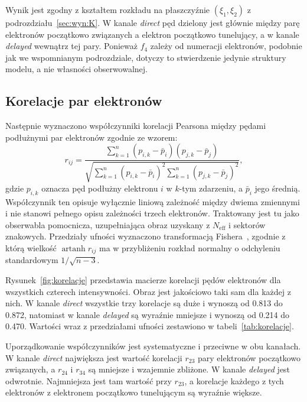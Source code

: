 \documentclass[12pt,a4paper]{article}
\newcommand{\Neff}{N_{\mathrm{eff}}}
\begin{document}
Wynik jest zgodny z kształtem rozkładu na płaszczyźnie $(\xi_1,\xi_2)$
z podrozdziału~\ref{sec:wyn:K}. W kanale \emph{direct} pęd dzielony
jest głównie między parę elektronów początkowo związanych a elektron
początkowo tunelujący, a w kanale \emph{delayed} wewnątrz tej pary.
Ponieważ $f_4$ zależy od numeracji elektronów, podobnie jak we wspomnianym podrozdziale, dotyczy to stwierdzenie jedynie struktury modelu, a nie własności obserwowalnej.

\subsection{Korelacje par elektronów}
\label{sec:wyn:korelacje}

Następnie wyznaczono współczynniki korelacji Pearsona między pędami
podłużnymi par elektronów zgodnie ze wzorem:
\begin{equation}
  r_{ij}=\frac{\displaystyle\sum_{k=1}^{n}\left(p_{i,k}-\bar{p}_i\right)\left(p_{j,k}-\bar{p}_j\right)}
              {\sqrt{\displaystyle\sum_{k=1}^{n}\left(p_{i,k}-\bar{p}_i\right)^{2}
                     \displaystyle\sum_{k=1}^{n}\left(p_{j,k}-\bar{p}_j\right)^{2}}},
  \label{eq:pearson}
\end{equation}
gdzie $p_{i,k}$ oznacza pęd podłużny elektronu $i$ w $k$-tym zdarzeniu,
a $\bar{p}_i$ jego średnią. Współczynnik ten opisuje wyłącznie liniową
zależność między dwiema zmiennymi i nie stanowi pełnego opisu
zależności trzech elektronów. Traktowany jest tu jako obserwabla
pomocnicza, uzupełniająca obraz uzyskany z $\Neff$ i sektorów
znakowych. Przedziały ufności wyznaczono transformacją
Fishera~\cite{Fisher1921}, zgodnie z którą wielkość
$\operatorname{artanh} r_{ij}$ ma w przybliżeniu rozkład normalny
o odchyleniu standardowym $1/\sqrt{n-3}$.

Rysunek~\ref{fig:korelacje} przedstawia macierze korelacji pędów elektronów dla
wszystkich czterech intensywności. Obraz jest jakościowo taki sam dla
każdej z nich. W kanale \emph{direct} wszystkie trzy
korelacje są duże i wynoszą od \num{0.813} do \num{0.872}, natomiast
w kanale \emph{delayed} są wyraźnie mniejsze i wynoszą od \num{0.214}
do \num{0.470}. Wartości wraz z przedziałami ufności zestawiono
w tabeli~\ref{tab:korelacje}.

Uporządkowanie współczynników jest systematyczne i przeciwne w obu
kanałach. W kanale \emph{direct} największa jest wartość korelacji $r_{23}$
pary elektronów początkowo związanych, a $r_{24}$ i $r_{34}$ są mniejsze
i wzajemnie zbliżone. W kanale \emph{delayed} jest odwrotnie.
Najmniejsza jest tam wartość przy $r_{23}$, a korelacje każdego z tych elektronów
z elektronem początkowo tunelującym są wyraźnie większe.
\end{document}
